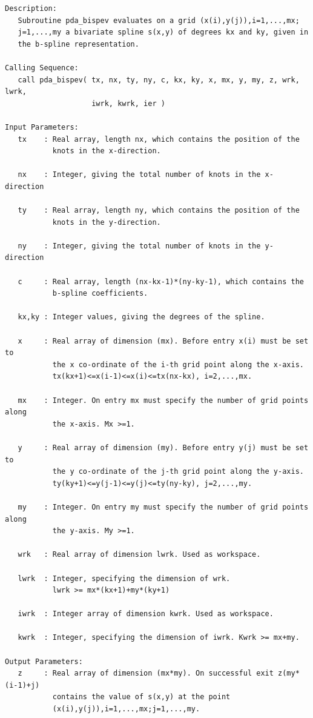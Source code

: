 \documentclass[11pt,twoside]{article}
\begin{document}
\begin{verbatim}
Description:
   Subroutine pda_bispev evaluates on a grid (x(i),y(j)),i=1,...,mx;
   j=1,...,my a bivariate spline s(x,y) of degrees kx and ky, given in
   the b-spline representation.

Calling Sequence:
   call pda_bispev( tx, nx, ty, ny, c, kx, ky, x, mx, y, my, z, wrk, lwrk,
                    iwrk, kwrk, ier )

Input Parameters:
   tx    : Real array, length nx, which contains the position of the
           knots in the x-direction.

   nx    : Integer, giving the total number of knots in the x-direction

   ty    : Real array, length ny, which contains the position of the
           knots in the y-direction.

   ny    : Integer, giving the total number of knots in the y-direction

   c     : Real array, length (nx-kx-1)*(ny-ky-1), which contains the
           b-spline coefficients.

   kx,ky : Integer values, giving the degrees of the spline.

   x     : Real array of dimension (mx). Before entry x(i) must be set to
           the x co-ordinate of the i-th grid point along the x-axis.
           tx(kx+1)<=x(i-1)<=x(i)<=tx(nx-kx), i=2,...,mx.

   mx    : Integer. On entry mx must specify the number of grid points along
           the x-axis. Mx >=1.

   y     : Real array of dimension (my). Before entry y(j) must be set to
           the y co-ordinate of the j-th grid point along the y-axis.
           ty(ky+1)<=y(j-1)<=y(j)<=ty(ny-ky), j=2,...,my.

   my    : Integer. On entry my must specify the number of grid points along
           the y-axis. My >=1.

   wrk   : Real array of dimension lwrk. Used as workspace.

   lwrk  : Integer, specifying the dimension of wrk.
           lwrk >= mx*(kx+1)+my*(ky+1)

   iwrk  : Integer array of dimension kwrk. Used as workspace.

   kwrk  : Integer, specifying the dimension of iwrk. Kwrk >= mx+my.

Output Parameters:
   z     : Real array of dimension (mx*my). On successful exit z(my*(i-1)+j)
           contains the value of s(x,y) at the point
           (x(i),y(j)),i=1,...,mx;j=1,...,my.


\end{verbatim}
\end{document}

